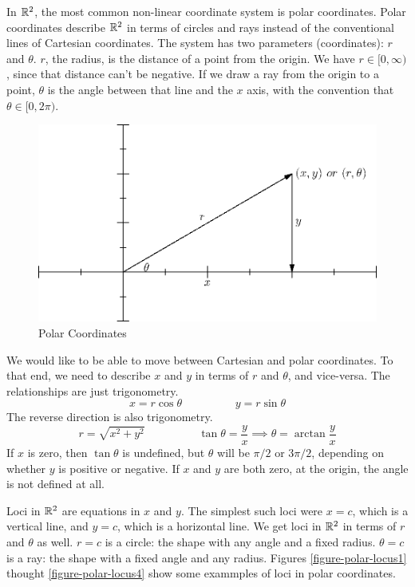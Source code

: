 \documentclass[fleqn,letterpaper]{report}
\begin{document}
In $\mathbb{R}^2$, the most common non-linear coordinate system is polar
coordinates. Polar coordinates describe $\mathbb{R}^2$ in terms of
circles and rays instead of the conventional lines of
Cartesian coordinates. The system has two parameters
(coordinates): $r$ and $\theta$. $r$, the radius, is the
distance of a point from the origin. We have $r \in
[0, \infty)$, since that distance can't be negative. If we
draw a ray from the origin to a point, $\theta$
is the angle between that line and the $x$ axis, with the
convention that $\theta \in [0, 2\pi)$. 

\begin{figure}[ht]
\centering
\includegraphics[width=12cm]{figure26.eps}
\caption{Polar Coordinates}
\label{figure-polar-coordinates}
\end{figure}

We would like to be able to move between Cartesian and polar
coordinates. To that end, we need to describe $x$ and $y$
in terms of $r$ and $\theta$, and vice-versa. The
relationships are just trigonometry.
\begin{equation*}
x = r \cos \theta \hspace{2cm} y = r \sin \theta
\end{equation*}
The reverse direction is also trigonometry.
\begin{equation*}
r = \sqrt{x^2 + y^2} \hspace{2cm} \tan \theta = \frac{y}{x}
\implies \theta = \arctan \frac{y}{x}
\end{equation*}
If $x$ is zero, then $\tan \theta$ is undefined, but $\theta$
will be $\pi/2$ or $3\pi/2$, depending on whether $y$ is
positive or negative. If $x$ and $y$ are both zero, at the
origin, the angle is not defined at all.

Loci in $\mathbb{R}^2$ are equations in $x$ and $y$. The simplest
such loci were $x=c$, which is a vertical line, and $y=c$,
which is a horizontal line. We get loci in $\mathbb{R}^2$ in terms
of $r$ and $\theta$ as well. $r=c$ is a circle: the shape
with any angle and a fixed radius. $\theta =c$ is a ray: the
shape with a fixed angle and any radius.  Figures
\ref{figure-polar-locus1} thought \ref{figure-polar-locus4} show some
exammples of loci in polar coordinates.
\end{document}
